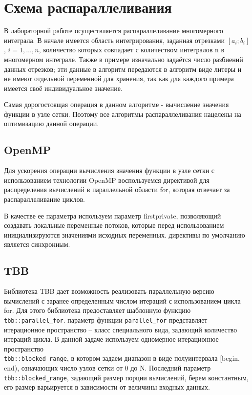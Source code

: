 \documentclass{report}
\begin{document}
\newpage

\section*{Схема распараллеливания}

В лабораторной работе осуществляется распараллеливание многомерного интеграла. В начале имеется область интегрирования, заданная отрезками $[a_i; b_i]$, $i = 1,\ldots, n$, количество которых совпадает с количеством интегралов n в многомерном интеграле. Также в примере изначально задаётся число разбиений данных отрезков; эти данные в алгоритм передаются в алгоритм виде литеры и не имеют отдельной переменной для хранения, так как для каждого примера имеется своё индивидуальное значение.
\par Самая дорогостоящая операция в данном алгоритме - вычисление значения функции в узле сетки. Поэтому все алгоритмы распараллеливания нацелены на оптимизацию данной операции.
\subsection*{OpenMP}
\par Для ускорения операции вычисления значения функции в узле сетки с использованием технологии OpenMP воспользуемся директивой для распределения вычислений в параллельной области for, которая отвечает за распараллеливание циклов.
\par В качестве ее параметра используем параметр firstprivate, позволяющий создавать локальные переменные потоков, которые перед использованием инициализируются значениями исходных переменных.
 директивы по умолчанию является синхронным.


\subsection*{TBB}
\par Библиотека TBB дает возможность реализовать параллельную версию вычислений с заранее определенным числом итераций с использованием цикла for. Для этого библиотека предоставляет шаблонную функцию \verb|tbb::parallel_for|.
 параметр функции \verb|parallel_for| представляет итерационное пространство – класс специального вида, задающий количество итераций цикла.
В данной задаче используем одномерное итерационное пространство \\ \verb|tbb::blocked_range|, в котором задаем диапазон в виде полуинтервала [begin, end), означающих число узлов сетки от 0 до N. Последний параметр\\ \verb|tbb::blocked_range|, задающий размер порции вычислений, берем константным, его размер варьируется в зависимости от величины входных данных.
\end{document}
